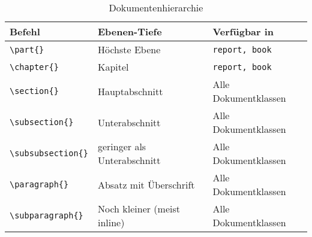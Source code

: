 \begin{table}[H]
    \centering
    \begin{tabular}{lll}
        \toprule
        \textbf{Befehl}                           & \textbf{Ebenen-Tiefe}       & \textbf{Verfügbar in} \\
        \midrule
        \texttt{\textbackslash part\{\}}          & Höchste Ebene               & \texttt{report, book} \\
        \texttt{\textbackslash chapter\{\}}       & Kapitel                     & \texttt{report, book} \\
        \texttt{\textbackslash section\{\}}       & Hauptabschnitt              & Alle Dokumentklassen  \\
        \texttt{\textbackslash subsection\{\}}    & Unterabschnitt              & Alle Dokumentklassen  \\
        \texttt{\textbackslash subsubsection\{\}} & geringer als Unterabschnitt & Alle Dokumentklassen  \\
        \texttt{\textbackslash paragraph\{\}}     & Absatz mit Überschrift      & Alle Dokumentklassen  \\
        \texttt{\textbackslash subparagraph\{\}}  & Noch kleiner (meist inline) & Alle Dokumentklassen  \\
        \bottomrule
    \end{tabular}
    \caption{Dokumentenhierarchie}
    \label{tab:dokumenten_hierarchie}
\end{table}
